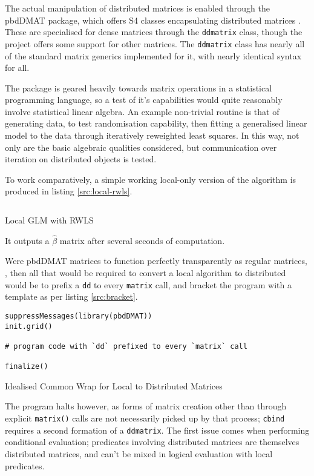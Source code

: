The actual manipulation of distributed matrices is enabled through the pbdDMAT
package, which offers S4 classes encapsulating distributed matrices
\cite{pbdDMATpackage}. These are specialised for dense matrices through the
\texttt{ddmatrix} class, though the project offers some support for other
matrices. The \texttt{ddmatrix} class has nearly all of the standard matrix
generics implemented for it, with nearly identical syntax for all.

The package is geared heavily towards matrix operations in a statistical
programming language, so a test of it's capabilities would quite reasonably
involve statistical linear algebra. An example non-trivial routine is that of
generating data, to test randomisation capability, then fitting a generalised
linear model to the data through iteratively reweighted least squares. In this
way, not only are the basic algebraic qualities considered, but communication
over iteration on distributed objects is tested.

To work comparatively, a simple working local-only version of the algorithm is
produced in listing \ref{src:local-rwls}.

\begin{listing}
\inputminted{r}{R/review-rwls.R}
        \caption{Local GLM with RWLS}
        \label{src:local-rwls}
\end{listing}

It outputs a \(\hat{\beta}\) matrix after several seconds of computation.

Were pbdDMAT matrices to function perfectly transparently as regular matrices, , then all that would be required to convert a local algorithm to
distributed would be to prefix a \texttt{dd} to every \texttt{matrix} call, and
bracket the program with a template as per listing \ref{src:bracket}.

\begin{listing}
\begin{verbatim}
suppressMessages(library(pbdDMAT))
init.grid()

# program code with `dd` prefixed to every `matrix` call

finalize()
\end{verbatim}
\caption{Idealised Common Wrap for Local to Distributed Matrices}\label{src:bracket}
\end{listing}

The program halts however, as forms of matrix creation other than through explicit \texttt{matrix()} calls are not necessarily picked up by that process; \texttt{cbind} requires a second formation of a \texttt{ddmatrix}. 
The first issue comes when performing conditional evaluation; predicates involving distributed matrices are themselves distributed matrices, and can't be mixed in logical evaluation with local predicates.

